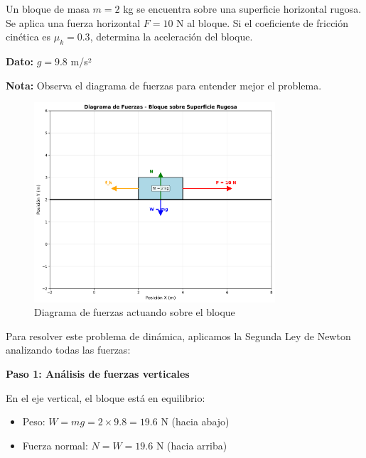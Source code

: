 \begin{ejercicio}[
  id=FISU_DIN_001,
  materia_principal=fisica_preuniversitaria,
  codigo_materia=FISU,
  capitulo=dinamica,
  subtema=segunda_ley_newton,
  nivel=intermedio,
  procedencia="Examen CEPRE 2023",
  visibilidad=web_impreso,
  tiempo_estimado=8,
  libros={fisica_basica, fisica_mecanica},
  dificultad=3,
  tags={friccion, fuerzas, aceleracion, segunda_ley_newton},
  youtube_url="https://www.youtube.com/watch?v=ejemplo_fisica",
  mostrar_solucion=true,
  libro_promocion=""
]
Un bloque de masa $m = 2$ kg se encuentra sobre una superficie horizontal rugosa. Se aplica una fuerza horizontal $F = 10$ N al bloque. Si el coeficiente de fricción cinética es $\mu_k = 0.3$, determina la aceleración del bloque.

\textbf{Dato:} $g = 9.8$ m/s²

\textbf{Nota:} Observa el diagrama de fuerzas para entender mejor el problema.

\begin{figure}[h]
\centering
\includegraphics[width=0.8\textwidth]{imagenes/diagrama_fuerzas_001.png}
\caption{Diagrama de fuerzas actuando sobre el bloque}
\label{fig:diagrama_fuerzas}
\end{figure}

\begin{solucion}
Para resolver este problema de dinámica, aplicamos la Segunda Ley de Newton analizando todas las fuerzas:

\textbf{Paso 1: Análisis de fuerzas verticales}

En el eje vertical, el bloque está en equilibrio:
\begin{itemize}
\item Peso: $W = mg = 2 \times 9.8 = 19.6$ N (hacia abajo)
\item Fuerza normal: $N = W = 19.6$ N (hacia arriba)
\end{itemize}


\end{solucion}
\end{ejercicio}
